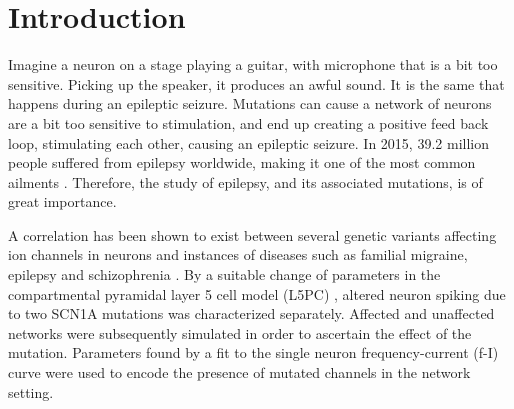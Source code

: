 \section{Introduction}

Imagine a neuron on a stage playing a guitar, with microphone that is a bit too sensitive. Picking
up the  speaker, it produces an awful sound. It is the same that happens during an epileptic
seizure. Mutations can cause a network of neurons are a bit too sensitive to stimulation,
and end up creating a positive feed back loop, stimulating each other, causing an epileptic seizure.
In 2015, 39.2 million people suffered from epilepsy worldwide, making it one of the most common
ailments \cite{vos2016global}. Therefore, the study of epilepsy, and its associated mutations, is
of great importance.

A correlation has been shown to exist between several genetic variants affecting ion channels in
neurons and instances of diseases such as familial migraine, epilepsy and schizophrenia
\cite{vanmolkot2007novel,escayg2010sodium,maki2016functional}. By a suitable change of parameters in
the compartmental pyramidal layer 5 cell model (L5PC) \cite{hay2011models}, altered neuron spiking
due to two SCN1A mutations was characterized separately. Affected and unaffected networks were
subsequently simulated in order to ascertain the effect of the mutation. Parameters found by a fit
to the single neuron frequency-current (f-I) curve were used to encode the presence of mutated
channels in the network setting.
